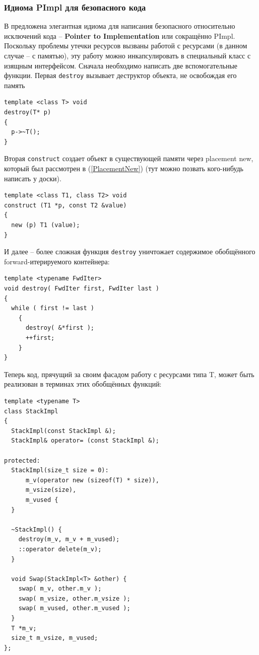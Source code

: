 \documentclass[a4paper,12pt,oneside]{article}
\begin{document}
\subsubsection{Идиома PImpl для безопасного кода}\label{PImpl}

В \cite{exceptionalcpp} предложена элегантная идиома для написания безопасного относительно исключений кода -- \textbf{Pointer to Implementation} или сокращённо PImpl. Поскольку проблемы утечки ресурсов вызваны работой с ресурсами (в данном случае -- с памятью), эту работу можно инкапсулировать в специальный класс с изящным интерфейсом. Сначала необходимо написать две вспомогательные функции. Первая \lstinline!destroy! вызывает деструктор объекта, не освобождая его память

\begin{lstlisting}
template <class T> void
destroy(T* p)
{
  p->~T();
}
\end{lstlisting}

Вторая \lstinline!construct! создает объект в существующей памяти через placement new, который был рассмотрен в (\ref{PlacementNew}) (тут можно позвать кого-нибудь написать у доски).

\begin{lstlisting}
template <class T1, class T2> void
construct (T1 *p, const T2 &value)
{
  new (p) T1 (value);
}
\end{lstlisting}

И далее -- более сложная функция \lstinline!destroy! уничтожает содержимое обобщённого forward-итерируемого контейнера:

\begin{lstlisting}
template <typename FwdIter>
void destroy( FwdIter first, FwdIter last )
{
  while ( first != last )
    {
      destroy( &*first ); 
      ++first;
    }
}
\end{lstlisting}

Теперь код, прячущий за своим фасадом работу с ресурсами типа T, может быть реализован в терминах этих обобщённых функций:

\begin{lstlisting}
template <typename T>
class StackImpl
{
  StackImpl(const StackImpl &);
  StackImpl& operator= (const StackImpl &);

protected:
  StackImpl(size_t size = 0): 
      m_v(operator new (sizeof(T) * size)), 
      m_vsize(size), 
      m_vused {
  }

  ~StackImpl() { 
    destroy(m_v, m_v + m_vused); 
    ::operator delete(m_v); 
  }

  void Swap(StackImpl<T> &other) {
    swap( m_v, other.m_v );
    swap( m_vsize, other.m_vsize );
    swap( m_vused, other.m_vused );
  }
  T *m_v;
  size_t m_vsize, m_vused;
};
\end{lstlisting}
\end{document}
